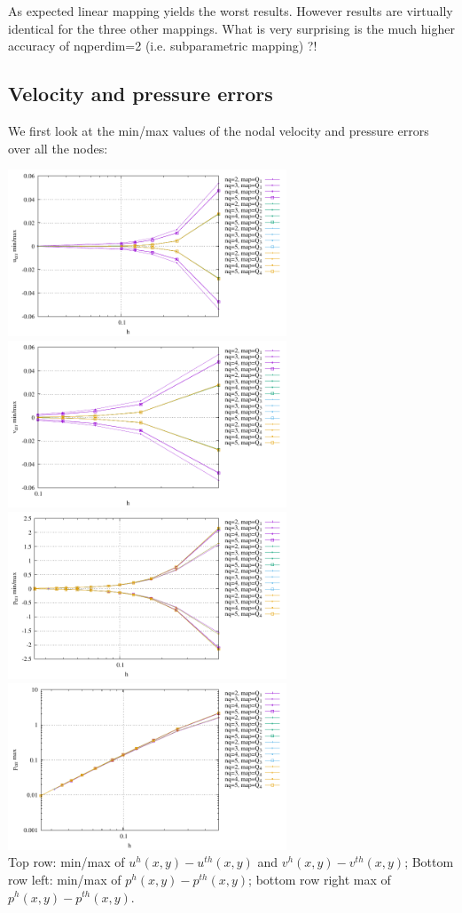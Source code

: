 As expected linear mapping yields the worst results. However results are virtually identical for 
the three other mappings.
What is very surprising is the much higher accuracy of {\python nqperdim=2} (i.e. subparametric mapping) ?!


\subsection*{Velocity and pressure errors}

We first look at the min/max values of the nodal velocity and pressure errors over all the nodes:
\begin{center}
\includegraphics[width=8.3cm]{python_codes/fieldstone_152/results/exp0/u_err}
\includegraphics[width=8.3cm]{python_codes/fieldstone_152/results/exp0/v_err}\\
\includegraphics[width=8.3cm]{python_codes/fieldstone_152/results/exp0/p_err}
\includegraphics[width=8.3cm]{python_codes/fieldstone_152/results/exp0/p_err_max}\\
{\captionfont Top row: min/max of $u^h(x,y)-u^{th}(x,y)$ and $v^h(x,y)-v^{th}(x,y)$;
Bottom row left: min/max of $p^h(x,y)-p^{th}(x,y)$; bottom row right max of  $p^h(x,y)-p^{th}(x,y)$.} 
\end{center}

